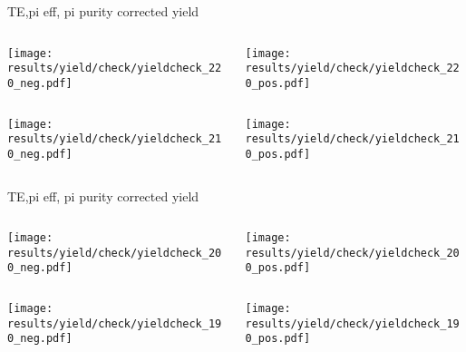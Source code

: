 \begin{frame}{TE,pi eff, pi purity corrected yield}
\begin{columns}
\begin{column}[T]{0.5\textwidth}
\texttt{[image: results/yield/check/yieldcheck\_220\_neg.pdf]}
\end{column}
\begin{column}[T]{0.5\textwidth}
\texttt{[image: results/yield/check/yieldcheck\_220\_pos.pdf]}
\end{column}
\end{columns}
\begin{columns}
\begin{column}[T]{0.5\textwidth}
\texttt{[image: results/yield/check/yieldcheck\_210\_neg.pdf]}
\end{column}
\begin{column}[T]{0.5\textwidth}
\texttt{[image: results/yield/check/yieldcheck\_210\_pos.pdf]}
\end{column}
\end{columns}
\end{frame}
\begin{frame}{TE,pi eff, pi purity corrected yield}
\begin{columns}
\begin{column}[T]{0.5\textwidth}
\texttt{[image: results/yield/check/yieldcheck\_200\_neg.pdf]}
\end{column}
\begin{column}[T]{0.5\textwidth}
\texttt{[image: results/yield/check/yieldcheck\_200\_pos.pdf]}
\end{column}
\end{columns}
\begin{columns}
\begin{column}[T]{0.5\textwidth}
\texttt{[image: results/yield/check/yieldcheck\_190\_neg.pdf]}
\end{column}
\begin{column}[T]{0.5\textwidth}
\texttt{[image: results/yield/check/yieldcheck\_190\_pos.pdf]}
\end{column}
\end{columns}
\end{frame}
